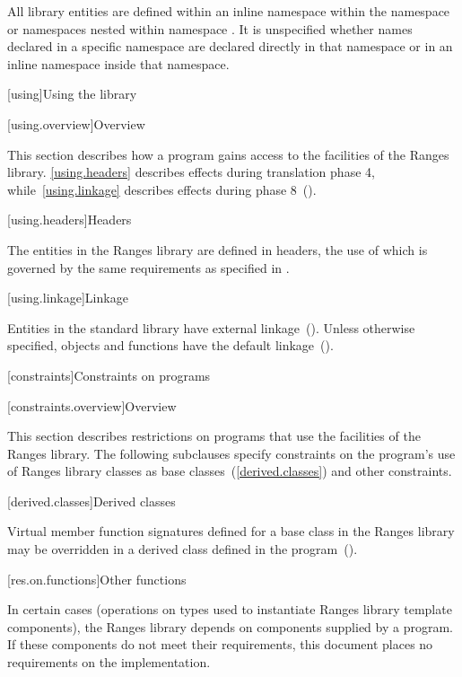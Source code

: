 \pnum
All library entities are defined within an inline namespace  within
the namespace  or namespaces nested within
namespace .
It is unspecified whether names declared in a specific namespace are declared
directly in that namespace or in an inline namespace inside that namespace.

[using]{Using the library}

[using.overview]{Overview}

\pnum
This section describes how a \Cpp program gains access to the facilities of the
Ranges library. \ref{using.headers} describes effects during translation
phase 4, while~\ref{using.linkage} describes effects during phase
8~().

[using.headers]{Headers}

The entities in the Ranges library are defined in headers, the use of which is
governed by the same requirements as specified in .

[using.linkage]{Linkage}

\pnum
Entities in the \Cpp standard library have external
linkage~(). Unless otherwise specified, objects and functions
have the default  linkage~().

[constraints]{Constraints on programs}

[constraints.overview]{Overview}

\pnum
This section describes restrictions on \Cpp programs that use the facilities of
the Ranges library. The following subclauses specify constraints on the
program's use of Ranges library classes as base classes~(\ref{derived.classes})
and other constraints.

[derived.classes]{Derived classes}

\pnum
Virtual member function signatures defined
%
for a base class in the Ranges
%
%
library may be overridden in a derived class defined in the
program~().

[res.on.functions]{Other functions}

\pnum
In certain cases (operations on types used to instantiate Ranges library
template components), the Ranges library depends on components supplied by a
\Cpp program. If these components do not meet their requirements, this document
places no requirements on the implementation.

